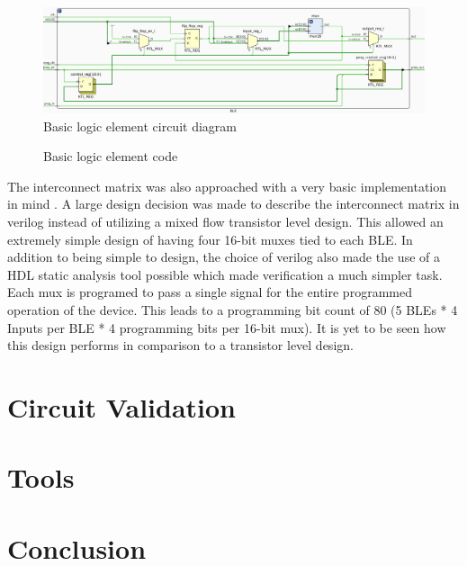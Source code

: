 \documentclass[12pt]{article}
\begin{document}
\begin{figure}[h]
    \centering
    \includegraphics[width=\textwidth]{circuit_ble}
    \caption{Basic logic element circuit diagram}
    \label{fig:ble}
\end{figure}

\begin{figure}[h]
    
    \caption{Basic logic element code}
    \label{code:ble}
\end{figure}

The interconnect matrix was also approached with a very basic implementation in mind
. A large design decision was made to describe the interconnect matrix in verilog 
instead of utilizing a mixed flow transistor level design. This allowed an extremely 
simple design of having four 16-bit muxes tied to each BLE. In addition to being 
simple to design, the choice of verilog also made the use of a HDL static analysis 
tool possible which made verification a much simpler task. Each mux is programed 
to pass a single signal for the entire programmed operation of the device. This leads 
to a programming bit count of 80 (5 BLEs * 4 Inputs per BLE * 4 programming bits 
per 16-bit mux). It is yet to be seen how this design performs in comparison to a 
transistor level design.


\section{Circuit Validation}

\section{Tools}

\section{Conclusion}
\end{document}
